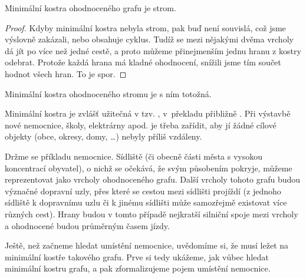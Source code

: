 \begin{observation}
 Minimální kostra ohodnoceného grafu je strom.
\end{observation}
\begin{proof}
 Kdyby minimální kostra nebyla strom, pak buď není souvislá, což jsme výslovně
 zakázali, nebo obsahuje cyklus. Tudíž se mezi nějakými dvěma vrcholy dá jít po
 více než jedné cestě, a proto můžeme přinejmenším jednu hranu z kostry
 odebrat. Protože každá hrana má kladné ohodnocení, snížili jsme tím součet
 hodnot všech hran. To je spor.
\end{proof}

\begin{corollary}
 Minimální kostra ohodnoceného stromu je s ním totožná.
\end{corollary}

Minimální kostra je zvlášť užitečná v tzv. ,
v~překladu přibližně . Při výstavbě nové
nemocnice, školy, elektrárny apod. je třeba zařídit, aby jí žádné cílové
objekty (obce, okresy, domy, \ldots) nebyly příliš vzdáleny.

Držme se příkladu nemocnice. Sídliště (či obecně části města s vysokou
koncentrací obyvatel), o nichž se očekává, že svým působením pokryje, můžeme
reprezentovat jako vrcholy ohodnoceného grafu. Další vrcholy tohoto grafu budou
význačné dopravní uzly, přes které se cestou mezi sídlišti projíždí (z jednoho
sídliště k dopravnímu uzlu či k jinému sídlišti může samozřejmě existovat více
různých cest). Hrany budou v tomto případě nejkratší silniční spoje mezi
vrcholy a ohodnocené budou průměrným časem jízdy.

Ještě, než začneme hledat umístění nemocnice, uvědomíme si, že musí ležet na
minimální kostře takového grafu. Prve si tedy ukážeme, jak vůbec hledat
minimální kostru grafu, a pak zformalizujeme pojem  umístění
nemocnice.


